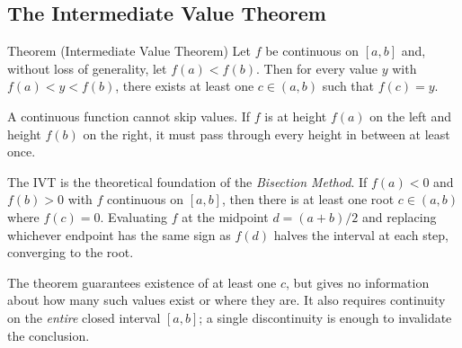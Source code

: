 \subsection*{The Intermediate Value Theorem}

\begin{theorembox}{Theorem (Intermediate Value Theorem)}
Let $f$ be continuous on $[a, b]$ and, without loss of generality,
let $f(a) < f(b)$.
Then for every value $y$ with $f(a) < y < f(b)$, there exists at
least one $c \in (a, b)$ such that $f(c) = y$.
\end{theorembox}

\begin{remark*}[Intuition]
A continuous function cannot skip values.
If $f$ is at height $f(a)$ on the left and height $f(b)$ on the right,
it must pass through every height in between at least once.
\end{remark*}

\begin{remark*}
The IVT is the theoretical foundation of the \emph{Bisection Method}.
If $f(a) < 0$ and $f(b) > 0$ with $f$ continuous on $[a, b]$, then
there is at least one root $c \in (a, b)$ where $f(c) = 0$.
Evaluating $f$ at the midpoint $d = (a + b)/2$ and replacing whichever
endpoint has the same sign as $f(d)$ halves the interval at each step,
converging to the root.
\end{remark*}

\begin{remark*}
The theorem guarantees existence of at least one $c$, but gives no
information about how many such values exist or where they are.
It also requires continuity on the \emph{entire} closed interval
$[a, b]$; a single discontinuity is enough to invalidate the
conclusion.
\end{remark*}